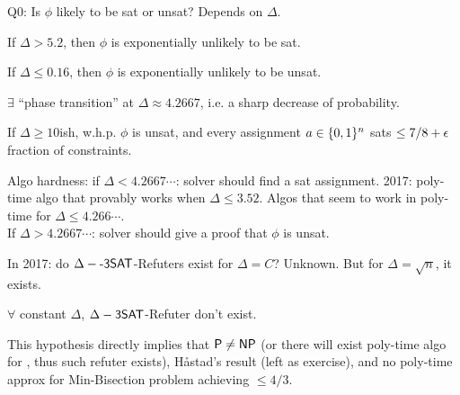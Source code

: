 \documentclass{article}
\begin{document}
Q0: Is \(\phi\) likely to be sat or unsat? Depends on \(\Delta\).

\begin{exercise}
  If \(\Delta > 5.2\), then \(\phi\) is exponentially unlikely to be sat.
\end{exercise}

\begin{theorem}
  If \(\Delta \leq 0.16\), then \(\phi\) is exponentially unlikely to be unsat.
\end{theorem}

\begin{conjecture}
  \(\exists\) ``phase transition'' at \(\Delta \approx 4.2667\), i.e. a sharp decrease of probability.
\end{conjecture}

\begin{exercise}
  If \(\Delta \geq 10\)ish, w.h.p. \(\phi\) is unsat, and every assignment \(a \in \lbrace0, 1\rbrace^n\)  sats \(\leq 7/8 + \epsilon\) fraction of constraints.
\end{exercise}

Algo hardness: if \(\Delta < 4.2667\cdots\): solver should find a sat assignment.
2017: poly-time algo that provably works when \(\Delta \leq 3.52\).
Algos that seem to work in poly-time for \(\Delta \leq 4.266\cdots\). \\
If \(\Delta > 4.2667\cdots\): solver should give a proof that \(\phi\) is unsat.


In 2017: do \(\Delta-\text{\sf -3SAT}\)-Refuters exist for \(\Delta = C\)? Unknown. But for \(\Delta = \sqrt{n}\), it exists.

\begin{hypothesis}
  \(\forall\) constant \(\Delta\), \(\Delta-\text{\sf 3SAT}\)-Refuter don't exist.
\end{hypothesis}

This hypothesis directly implies that \(\text{\sf P} \neq \text{\sf NP}\) (or there will exist poly-time algo for , thus such refuter exists), Håstad's result (left as exercise), and no poly-time approx for Min-Bisection problem achieving \(\leq 4/3\).
\end{document}
